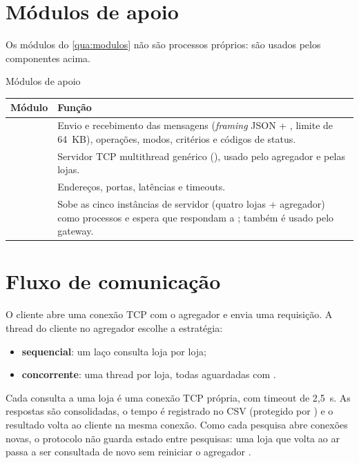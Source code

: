 \section{Módulos de apoio}

Os módulos do \autoref{qua:modulos} não são processos próprios: são usados pelos componentes acima.

\begin{quadro}[!htbp]
  \centering\small
  \caption{Módulos de apoio}\label{qua:modulos}
  \begin{tabularx}{\textwidth}{|L{3.8cm}|Y|}
    \hline
    \textbf{Módulo} & \textbf{Função} \\ \hline
     & Envio e recebimento das mensagens (\textit{framing} JSON + , limite de 64~KB), operações, modos, critérios e códigos de status. \\ \hline
     & Servidor TCP multithread genérico (), usado pelo agregador e pelas lojas. \\ \hline
     & Endereços, portas, latências e timeouts. \\ \hline
     & Sobe as cinco instâncias de servidor (quatro lojas + agregador) como processos e espera que respondam a ; também é usado pelo gateway. \\ \hline
  \end{tabularx}
  \fonteautores
\end{quadro}

\section{Fluxo de comunicação}

O cliente abre uma conexão TCP com o agregador e envia uma requisição. A thread do cliente no agregador escolhe a estratégia:

\begin{itemize}
  \item \textbf{sequencial}: um laço consulta loja por loja;
  \item \textbf{concorrente}: uma thread por loja, todas aguardadas com .
\end{itemize}

Cada consulta a uma loja é uma conexão TCP própria, com timeout de 2,5~s. As respostas são consolidadas, o tempo é registrado no CSV (protegido por ) e o resultado volta ao cliente na mesma conexão. Como cada pesquisa abre conexões novas, o protocolo não guarda estado entre pesquisas: uma loja que volta ao ar passa a ser consultada de novo sem reiniciar o agregador \cite{tanenbaum2007}.

